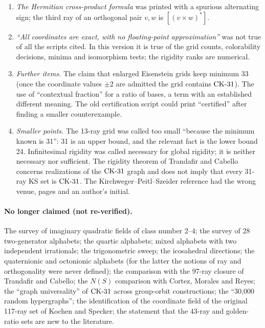 \begin{enumerate}[label=C\arabic*.,leftmargin=2.6em]
closed under completion (165 rays after completion, not 57).  The $\Q(\sqrt{-7})$ grid has 522
orthogonal pairs in total; version~9 said its 76 auxiliary rays ``add'' 522.  The integer grid
has 6 minimum sets in one symmetry class, not 162 in six.
\item \emph{The Hermitian cross-product formula} was printed with a spurious alternating sign;
the third ray of an orthogonal pair $v,w$ is $[(v\times w)^{*}]$.
\item \emph{``All coordinates are exact, with no floating-point approximation''} was not true of
all the scripts cited.  In this version it is true of the grid counts, colorability decisions,
minima and isomorphism tests; the rigidity ranks are numerical.
\item \emph{Further items.}  The claim that enlarged Eisenstein grids keep minimum 33 (once
the coordinate values $\pm2$ are admitted the grid contains $\mathrm{CK}\text{-}31$).  The use of ``contextual fraction'' for
a ratio of bases, a term with an established different meaning.  The old certification script
could print ``certified'' after finding a smaller counterexample.\item \emph{Smaller points.}  The 13-ray grid was called too small ``because the minimum known is
31'': 31 is an upper bound, and the relevant fact is the lower bound 24.  Infinitesimal rigidity
was called necessary for global rigidity; it is neither necessary nor sufficient.  The rigidity
theorem of Trandafir and Cabello concerns realizations of the $\mathrm{CK}\text{-}31$ graph and does not imply that
every 31-ray KS set is $\mathrm{CK}\text{-}31$.  The Kirchweger--Peitl--Szeider reference had the wrong venue,
pages and an author's initial.
\end{enumerate}

\paragraph{No longer claimed (not re-verified).}
The survey of imaginary quadratic fields of class number 2--4; the survey of 28 two-generator
alphabets; the quartic alphabets; mixed alphabets with two independent irrationals; the
trigonometric sweep; the icosahedral directions; the quaternionic and octonionic alphabets (for
the latter the notions of ray and orthogonality were never defined); the comparison with the
97-ray closure of Trandafir and Cabello; the $N(S)$ comparison with Cortez, Morales and Reyes;
the ``graph universality'' of $\mathrm{CK}\text{-}31$ across group-orbit constructions; the ``30{,}000 random
hypergraphs''; the identification of the coordinate field of the original 117-ray set of Kochen
and Specker; the statement that the 43-ray and golden-ratio sets are new to the literature.
